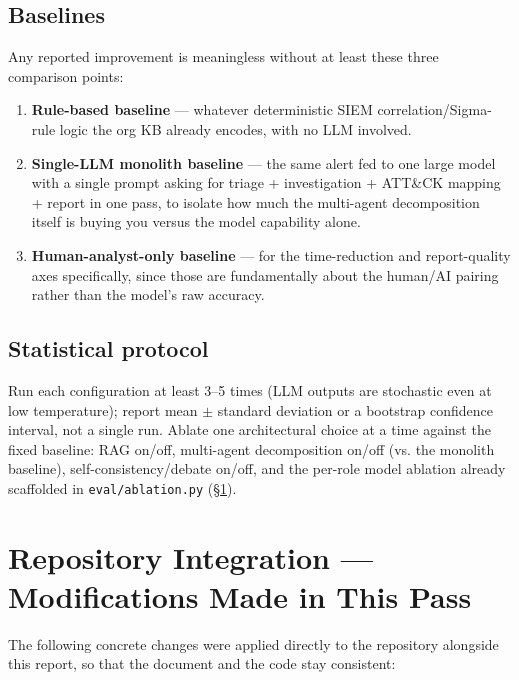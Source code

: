 \documentclass[11pt]{article}
\begin{document}
\subsection{Baselines}
Any reported improvement is meaningless without at least these three comparison points:
\begin{enumerate}[label=(\alph*)]
  \item \textbf{Rule-based baseline} --- whatever deterministic SIEM correlation/Sigma-rule logic the org KB already encodes, with no LLM involved.
  \item \textbf{Single-LLM monolith baseline} --- the same alert fed to one large model with a single prompt asking for triage + investigation + ATT\&CK mapping + report in one pass, to isolate how much the multi-agent decomposition itself is buying you versus the model capability alone.
  \item \textbf{Human-analyst-only baseline} --- for the time-reduction and report-quality axes specifically, since those are fundamentally about the human/AI pairing rather than the model's raw accuracy.
\end{enumerate}

\subsection{Statistical protocol}
Run each configuration at least 3--5 times (LLM outputs are stochastic even at low temperature); report mean $\pm$ standard deviation or a bootstrap confidence interval, not a single run. Ablate one architectural choice at a time against the fixed baseline: RAG on/off, multi-agent decomposition on/off (vs. the monolith baseline), self-consistency/debate on/off, and the per-role model ablation already scaffolded in \texttt{eval/ablation.py} (\S\ref{sec:integration}).

\section{Repository Integration --- Modifications Made in This Pass}
\label{sec:integration}

The following concrete changes were applied directly to the repository alongside this report, so that the document and the code stay consistent:
\end{document}

